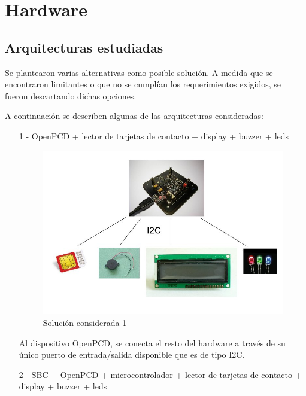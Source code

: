 \chapter{Hardware}

\section{Arquitecturas estudiadas}\label{arqEst}
Se plantearon varias alternativas como posible solución. A medida que se encontraron limitantes o que no se cumplían los requerimientos exigidos, se fueron descartando dichas opciones.

A continuación se describen algunas de las arquitecturas consideradas:

\begin{itemize}
\item[1 -] OpenPCD + lector de tarjetas de contacto + display + buzzer + leds
\bigskip

\begin{figure}[H]
\centering
  \begin{center}
  \includegraphics[scale=.4]{Imagenes/0.jpg} 
  \end{center}
  \caption{Solución considerada 1}\label{Fig:HW1} 
\end{figure}

\newpage
Al dispositivo OpenPCD, se conecta el resto del hardware a través de su único puerto de entrada/salida disponible que es de tipo I2C.

\bigskip
\item[2 -] SBC + OpenPCD + microcontrolador + lector de tarjetas de contacto + display + buzzer + leds
\bigskip


\end{itemize}
